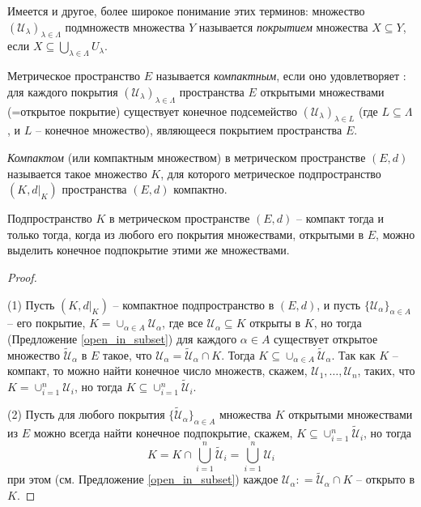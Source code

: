 Имеется и другое, более широкое понимание этих терминов: множество $(\mathscr{U}_\lambda)_{\lambda \in \Lambda}$ подмножеств множества $Y$ называется \textit{покрытием} множества $X\subseteq Y$, если $X \subseteq \bigcup_{\lambda \in \Lambda} U_\lambda$.


\begin{definition}
    Метрическое пространство $E$ называется \textit{компактным}, если оно удовлетворяет : для каждого покрытия $(\mathscr{U}_\lambda)_{\lambda \in \Lambda}$ пространства $E$ открытыми множествами (=открытое покрытие) существует конечное подсемейство $(\mathscr{U}_\lambda)_{\lambda \in L}$ (где $L \subseteq \Lambda$, и $L$ -- конечное множество), являющееся покрытием пространства $E.$
\end{definition}

\begin{definition}
\textit{Компактом} (или компактным множеством) в метрическом пространстве $(E,d)$ называется такое множество $K$, для которого метрическое подпространство $(K,d|_K)$ пространства $(E,d)$ компактно.
\end{definition}





\begin{lemma}
    Подпространство $K$ в метрическом пространстве $(E,d)$ -- компакт тогда и только тогда, когда из любого его покрытия множествами, открытыми в $E$, можно выделить конечное подпокрытие этими же множествами.
\end{lemma}

\begin{proof}~

    (1) Пусть $(K,d|_K)$ -- компактное подпространство в $(E,d)$, и пусть $\{ \mathscr{U}_\alpha \}_{\alpha \in A}$ -- его покрытие, \ie $K = \cup_{\alpha \in A} \mathscr{U}_\alpha$, где все $\mathscr{U}_\alpha \subseteq K$ открыты в $K$, но тогда (Предложение \ref{open_in_subset}) для каждого $\alpha \in A$ существует открытое множество $\widetilde{\mathscr{U}}_\alpha$ в $E$ такое, что $\mathscr{U}_\alpha= \widetilde{\mathscr{U}}_\alpha \cap K$. Тогда $K \subseteq \cup_{\alpha \in A} \widetilde{\mathscr{U}}_\alpha.$ Так как $K$ -- компакт, то можно найти конечное число множеств, скажем, $\mathscr{U}_1, \ldots, \mathscr{U}_n$, таких, что $K = \cup_{i=1}^n\mathscr{U}_i$, но тогда $K \subseteq \cup_{i=1}^n \widetilde{\mathscr{U}}_i$.

(2) Пусть для любого покрытия $\{\widetilde{\mathscr{U}}_\alpha\}_{\alpha \in A}$ множества $K$ открытыми множествами из $E$ можно всегда найти конечное подпокрытие, скажем, $K \subseteq \cup_{i=1}^n \widetilde{\mathscr{U}}_i$, но тогда 
\[
 K = K \cap \bigcup_{i=1}^n \widetilde{\mathscr{U}}_i= \bigcup_{i=1}^n \mathscr{U}_i
\]
при этом (см. Предложение \ref{open_in_subset}) каждое $\mathscr{U}_\alpha : = \widetilde{\mathscr{U}}_\alpha \cap K$ -- открыто в $K$.
\end{proof}




